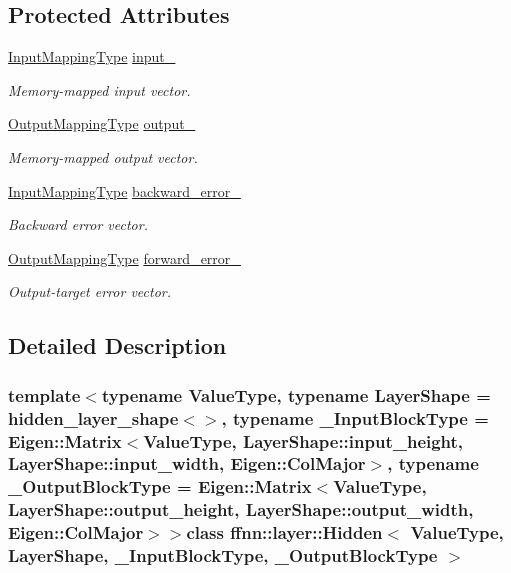 \subsection*{Protected Attributes}
\begin{DoxyCompactItemize}
\item 
\hyperlink{classffnn_1_1layer_1_1_hidden_a9297d5b8ac45dc288ee1b91f15bb4047}{Input\-Mapping\-Type} \hyperlink{classffnn_1_1layer_1_1_hidden_a1177e86b75ad7ba87aa4e855defa5851}{input\-\_\-}
\begin{DoxyCompactList}\small\item\em Memory-\/mapped input vector. \end{DoxyCompactList}\item 
\hyperlink{classffnn_1_1layer_1_1_hidden_a619ae9b0890cb86b66ac2b591b5a5610}{Output\-Mapping\-Type} \hyperlink{classffnn_1_1layer_1_1_hidden_adf9818c784dccc1860fe8384264cc4be}{output\-\_\-}
\begin{DoxyCompactList}\small\item\em Memory-\/mapped output vector. \end{DoxyCompactList}\item 
\hyperlink{classffnn_1_1layer_1_1_hidden_a9297d5b8ac45dc288ee1b91f15bb4047}{Input\-Mapping\-Type} \hyperlink{classffnn_1_1layer_1_1_hidden_a94312439d5029c9c779ff778f18f95a8}{backward\-\_\-error\-\_\-}
\begin{DoxyCompactList}\small\item\em Backward error vector. \end{DoxyCompactList}\item 
\hyperlink{classffnn_1_1layer_1_1_hidden_a619ae9b0890cb86b66ac2b591b5a5610}{Output\-Mapping\-Type} \hyperlink{classffnn_1_1layer_1_1_hidden_af1f439bdd3645a5ee444455d822b5143}{forward\-\_\-error\-\_\-}
\begin{DoxyCompactList}\small\item\em Output-\/target error vector. \end{DoxyCompactList}\end{DoxyCompactItemize}


\subsection{Detailed Description}
\subsubsection*{template$<$typename Value\-Type, typename Layer\-Shape = hidden\-\_\-layer\-\_\-shape$<$$>$, typename \-\_\-\-Input\-Block\-Type = Eigen\-::\-Matrix$<$\-Value\-Type, Layer\-Shape\-::input\-\_\-height,  Layer\-Shape\-::input\-\_\-width,  Eigen\-::\-Col\-Major$>$, typename \-\_\-\-Output\-Block\-Type = Eigen\-::\-Matrix$<$\-Value\-Type, Layer\-Shape\-::output\-\_\-height, Layer\-Shape\-::output\-\_\-width, Eigen\-::\-Col\-Major$>$$>$class ffnn\-::layer\-::\-Hidden$<$ Value\-Type, Layer\-Shape, \-\_\-\-Input\-Block\-Type, \-\_\-\-Output\-Block\-Type $>$}

